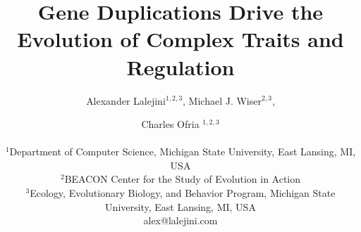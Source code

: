 \title{Gene Duplications Drive the Evolution of Complex Traits and Regulation}
\author{Alexander Lalejini$^{1, 2, 3}$, Michael J. Wiser$^{2, 3}$, \and Charles Ofria $^{1, 2, 3}$\\
\mbox{}\\
$^1$Department of Computer Science, Michigan State University, East Lansing, MI, USA \\
$^2$BEACON Center for the Study of Evolution in Action \\
$^3$Ecology, Evolutionary Biology, and Behavior Program, Michigan State University, East Lansing, MI, USA \\
alex@lalejini.com} %

\maketitle
